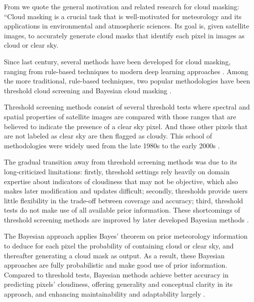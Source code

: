 \documentclass[sigplan,screen]{acmart}
\begin{document}
From \cite{las-2023-cloudmask-related} we quote the general motivation and related research for cloud masking: ``Cloud masking is a crucial task that is well-motivated for meteorology and its applications in environmental and atmospheric sciences. Its goal is, given satellite images, to accurately generate cloud masks that identify each pixel in images as cloud or clear sky.

Since last century, several methods have been developed for cloud masking, ranging from rule-based techniques \cite{Saunders1986AnAS,Saunders1988AnIM,Merchant2005ProbabilisticPB, Zhu2012ObjectbasedCA} to modern deep learning approaches \cite{Li2019DeepLB,Domnich2021KappaMaskAC,Yan2018CloudAC,WIELAND2019111203,JEPPESEN2019247}. Among the more traditional, rule-based techniques, two popular methodologies have been threshold cloud screening \cite{Saunders1986AnAS,Saunders1988AnIM} and Bayesian cloud masking \cite{Merchant2005ProbabilisticPB}. 

Threshold screening methods consist of several threshold tests where spectral and spatial properties of satellite images are compared with those ranges that are believed to indicate the presence of a clear sky pixel. And those other pixels that are not labeled as clear sky are then flagged as cloudy. This school of methodologies were widely used from the late 1980s to the early 2000s \cite{Merchant2005ProbabilisticPB}. 

The gradual transition away from threshold screening methods was due to its long-criticized limitations: firstly, threshold settings rely heavily on domain expertise about indicators of cloudiness that may not be objective, which also makes later modification and updates difficult; secondly, thresholds provide users little flexibility in the trade-off between coverage and accuracy; third, threshold tests do not make use of all available prior information. These shortcomings of threshold screening methods are improved by later developed Bayesian methods \cite{Merchant2005ProbabilisticPB}.

The Bayesian approach applies Bayes' theorem on prior meteorology information to deduce for each pixel the probability of containing cloud or clear sky, and thereafter generating a cloud mask as output. As a result, these Bayesian approaches are fully probabilistic and make good use of prior information. Compared to threshold tests, Bayesian methods achieve better accuracy in predicting pixels' cloudiness, offering generality and conceptual clarity in its approach, and enhancing maintainability and adaptability largely \cite{Merchant2005ProbabilisticPB}. 
\end{document}
